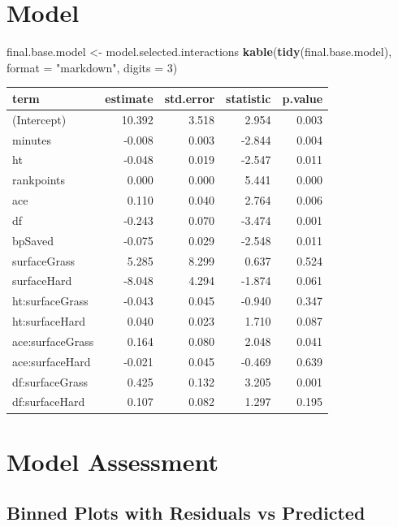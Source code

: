 \documentclass[]{article}
\newenvironment{Shaded}{\begin{snugshade}}{\end{snugshade}}
\newcommand{\DataTypeTok}[1]{\textcolor[rgb]{0.13,0.29,0.53}{#1}}
\newcommand{\DecValTok}[1]{\textcolor[rgb]{0.00,0.00,0.81}{#1}}
\newcommand{\KeywordTok}[1]{\textcolor[rgb]{0.13,0.29,0.53}{\textbf{#1}}}
\newcommand{\NormalTok}[1]{#1}
\newcommand{\StringTok}[1]{\textcolor[rgb]{0.31,0.60,0.02}{#1}}
\begin{document}
\hypertarget{model}{%
\section{Model}\label{model}}

\begin{Shaded}
\begin{Highlighting}[]
\NormalTok{final.base.model <-}\StringTok{ }\NormalTok{model.selected.interactions}
\KeywordTok{kable}\NormalTok{(}\KeywordTok{tidy}\NormalTok{(final.base.model), }\DataTypeTok{format =} \StringTok{"markdown"}\NormalTok{, }\DataTypeTok{digits =} \DecValTok{3}\NormalTok{)}
\end{Highlighting}
\end{Shaded}

\begin{longtable}[]{@{}lrrrr@{}}
\toprule
term & estimate & std.error & statistic & p.value\tabularnewline
\midrule
\endhead
(Intercept) & 10.392 & 3.518 & 2.954 & 0.003\tabularnewline
minutes & -0.008 & 0.003 & -2.844 & 0.004\tabularnewline
ht & -0.048 & 0.019 & -2.547 & 0.011\tabularnewline
rankpoints & 0.000 & 0.000 & 5.441 & 0.000\tabularnewline
ace & 0.110 & 0.040 & 2.764 & 0.006\tabularnewline
df & -0.243 & 0.070 & -3.474 & 0.001\tabularnewline
bpSaved & -0.075 & 0.029 & -2.548 & 0.011\tabularnewline
surfaceGrass & 5.285 & 8.299 & 0.637 & 0.524\tabularnewline
surfaceHard & -8.048 & 4.294 & -1.874 & 0.061\tabularnewline
ht:surfaceGrass & -0.043 & 0.045 & -0.940 & 0.347\tabularnewline
ht:surfaceHard & 0.040 & 0.023 & 1.710 & 0.087\tabularnewline
ace:surfaceGrass & 0.164 & 0.080 & 2.048 & 0.041\tabularnewline
ace:surfaceHard & -0.021 & 0.045 & -0.469 & 0.639\tabularnewline
df:surfaceGrass & 0.425 & 0.132 & 3.205 & 0.001\tabularnewline
df:surfaceHard & 0.107 & 0.082 & 1.297 & 0.195\tabularnewline
\bottomrule
\end{longtable}

\hypertarget{model-assessment}{%
\section{Model Assessment}\label{model-assessment}}

\hypertarget{binned-plots-with-residuals-vs-predicted}{%
\subsection{Binned Plots with Residuals vs
Predicted}\label{binned-plots-with-residuals-vs-predicted}}
\end{document}
